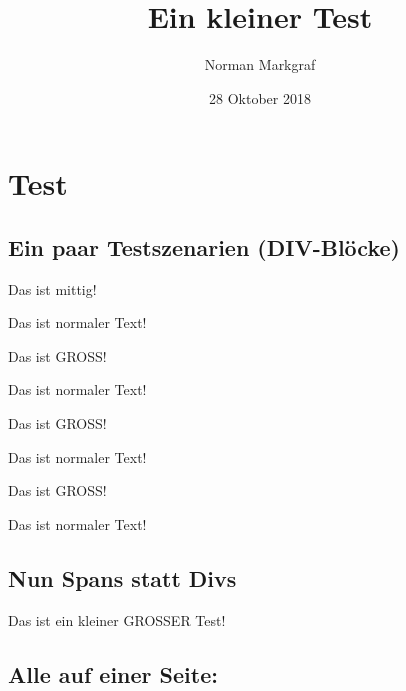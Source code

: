 \documentclass[]{article}
\title{Ein kleiner Test}
\author{Norman Markgraf}
\date{28 Oktober 2018}
\begin{document}
\maketitle

\hypertarget{test}{%
\section{Test}\label{test}}

\hypertarget{ein-paar-testszenarien-div-blocke}{%
\subsection{Ein paar Testszenarien
(DIV-Blöcke)}\label{ein-paar-testszenarien-div-blocke}}


\begin{center}

Das ist mittig!


\end{center}

Das ist normaler Text!

{\Large{}

Das ist GROSS!

}

Das ist normaler Text!


\begin{center}
{\Large{}

Das ist GROSS!

}
\end{center}

Das ist normaler Text!


\begin{center}
{\LARGE{}

Das ist GROSS!

}
\end{center}

Das ist normaler Text!

\hypertarget{nun-spans-statt-divs}{%
\subsection{Nun Spans statt Divs}\label{nun-spans-statt-divs}}

Das ist {{\small{}ein kleiner}} {{\Large{}GROSSER}} Test!

\hypertarget{alle-auf-einer-seite}{%
\subsection{Alle auf einer Seite:}\label{alle-auf-einer-seite}}
\end{document}
